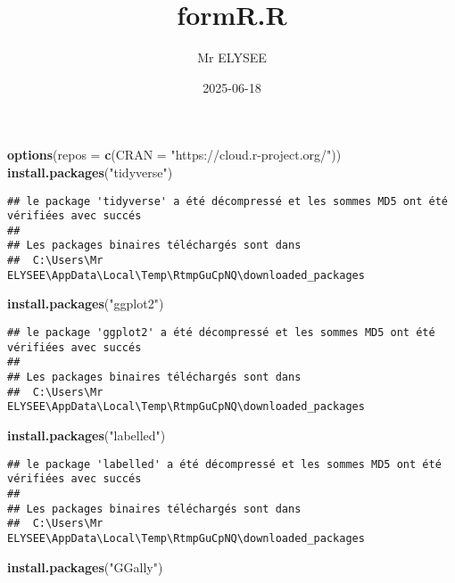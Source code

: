 \documentclass[
]{article}
\title{formR.R}
\author{Mr ELYSEE}
\date{2025-06-18}
\newenvironment{Shaded}{\begin{snugshade}}{\end{snugshade}}
\newcommand{\AttributeTok}[1]{\textcolor[rgb]{0.13,0.29,0.53}{#1}}
\newcommand{\FunctionTok}[1]{\textcolor[rgb]{0.13,0.29,0.53}{\textbf{#1}}}
\newcommand{\NormalTok}[1]{#1}
\newcommand{\StringTok}[1]{\textcolor[rgb]{0.31,0.60,0.02}{#1}}
\begin{document}
\maketitle

\begin{Shaded}
\begin{Highlighting}[]
\FunctionTok{options}\NormalTok{(}\AttributeTok{repos =} \FunctionTok{c}\NormalTok{(}\AttributeTok{CRAN =} \StringTok{"https://cloud.r{-}project.org/"}\NormalTok{))}
\FunctionTok{install.packages}\NormalTok{(}\StringTok{"tidyverse"}\NormalTok{)}
\end{Highlighting}
\end{Shaded}

\begin{verbatim}
## le package 'tidyverse' a été décompressé et les sommes MD5 ont été vérifiées avec succés
## 
## Les packages binaires téléchargés sont dans
##  C:\Users\Mr ELYSEE\AppData\Local\Temp\RtmpGuCpNQ\downloaded_packages
\end{verbatim}

\begin{Shaded}
\begin{Highlighting}[]
\FunctionTok{install.packages}\NormalTok{(}\StringTok{"ggplot2"}\NormalTok{)}
\end{Highlighting}
\end{Shaded}

\begin{verbatim}
## le package 'ggplot2' a été décompressé et les sommes MD5 ont été vérifiées avec succés
## 
## Les packages binaires téléchargés sont dans
##  C:\Users\Mr ELYSEE\AppData\Local\Temp\RtmpGuCpNQ\downloaded_packages
\end{verbatim}

\begin{Shaded}
\begin{Highlighting}[]
\FunctionTok{install.packages}\NormalTok{(}\StringTok{"labelled"}\NormalTok{)}
\end{Highlighting}
\end{Shaded}

\begin{verbatim}
## le package 'labelled' a été décompressé et les sommes MD5 ont été vérifiées avec succés
## 
## Les packages binaires téléchargés sont dans
##  C:\Users\Mr ELYSEE\AppData\Local\Temp\RtmpGuCpNQ\downloaded_packages
\end{verbatim}

\begin{Shaded}
\begin{Highlighting}[]
\FunctionTok{install.packages}\NormalTok{(}\StringTok{"GGally"}\NormalTok{)}
\end{Highlighting}
\end{Shaded}
\end{document}
